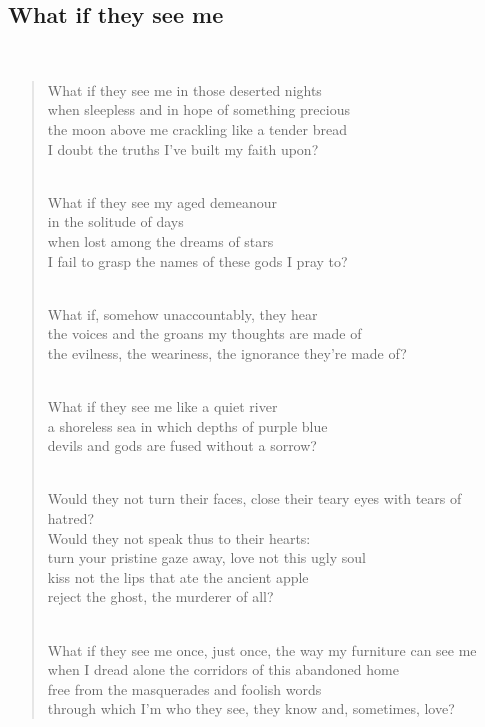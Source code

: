 \documentclass[a4paper, 12pt]{article}
\begin{document}
\pagebreak

\subsection{What if they see me}
~ 
\begin{verse}
    
What if they see me in those deserted nights\\
when sleepless and in hope of something precious\\
the moon above me crackling like a tender bread\\
I doubt the truths I’ve built my faith upon?\\
~ 

What if they see my aged demeanour\\
in the solitude of days\\
when lost among the dreams of stars\\
I fail to grasp the names of these gods I pray to?\\
~ 

What if, somehow unaccountably, they hear\\
the voices and the groans my thoughts are made of\\
the evilness, the weariness, the ignorance they’re made of?\\
~ 

What if they see me like a quiet river\\
a shoreless sea in which depths of purple blue\\
devils and gods are fused without a sorrow?\\
~ 

Would they not turn their faces, close their teary eyes with tears of hatred?\\
Would they not speak thus to their hearts:\\
turn your pristine gaze away, love not this ugly soul\\
kiss not the lips that ate the ancient apple\\
reject the ghost, the murderer of all?\\
~ 

What if they see me once, just once, the way my furniture can see me\\
when I dread alone the corridors of this abandoned home\\
free from the masquerades and foolish words\\
through which I’m who they see, they know and, sometimes, love?\\
\end{verse}
\end{document}
